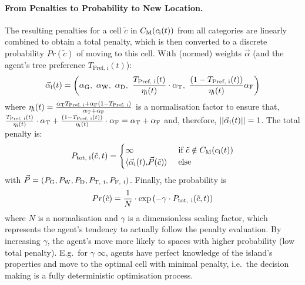 \paragraph{From Penalties to Probability to New Location.}
The resulting penalties for a cell $\tilde{c}$ in $C_{\rm M}(c_{\rm i}(t))$ from all categories are linearly combined to obtain a total penalty, which is then converted to a discrete probability $Pr(\tilde{c})$ of moving to this cell.
With (normed) weights $\vec{\alpha}$ (and the agent's tree preference $T_\text{Pref, i}(t)$):
\begin{equation}\label{eq:vecalpha}
\vec{\alpha}_{\rm i} (t) = \left(\alpha_{\rm G},\  \alpha_{\rm W}, \ \alpha_{\rm D}, \  \frac{T_\text{Pref, i}(t)}{\eta_{\rm i}(t)} \cdot \alpha_{\rm T}, \ \frac{(1-T_\text{Pref, i}(t))}{\eta_{\rm i}(t)} \alpha_{\rm F}\right)
\end{equation} 
where $\eta_{\rm i}(t) = \frac{\alpha_{\rm T} T_\text{Pref, i}+ \alpha_{\rm F} (1-T_\text{Pref, i})}{\alpha_{\rm T}+\alpha_{\rm F}}$ is a normalisation factor to ensure that, $\frac{T_\text{Pref, i}(t)}{\eta_{\rm i}(t)}\cdot \alpha_{\rm T} + \frac{(1-T_\text{Pref, i}(t))}{\eta_{\rm i}(t)} \cdot \alpha_{\rm F} = \alpha_{\rm T}+ \alpha_{\rm F}$ and, therefore, $||\vec{\alpha}_{\rm i} (t)||=1$. 
The total penalty is:
\begin{equation}
P_\text{tot, i}(\tilde{c}, t) =  \begin{cases} \infty & \text{ if } \tilde{c}\notin C_{\rm M}(c_{\rm i}(t))\\
	 \langle \vec{\alpha}_{\rm i} (t){, } \vec{P} (\tilde{c}) \rangle &  \text{ else}
	 \end{cases}
\end{equation}
with $\vec{P} = (P_{\rm G}, P_{\rm W}, P_{\rm D}, P_{\rm T, \ i}, P_{\rm F, \ i})$.
Finally, the probability is  
\begin{equation}
	Pr(\tilde{c})  = \frac{1}{N} \cdot \exp \left( - \gamma \cdot P_{\rm tot,\ i}(\tilde{c}, t) \right) 
\end{equation}
where $N$ is a normalisation and $\gamma$ is a dimensionless scaling factor, which represents the agent's tendency to actually follow the penalty evaluation. 
By increasing $\gamma$, the agent's move more likely to spaces with higher probability (low total penalty). 
E.g.\ for $\gamma$ \ra $\infty$, agents have perfect knowledge of the island's properties and move to the optimal cell with minimal penalty, i.e.\ the decision making is a fully deterministic optimisation process\footnotemark.
